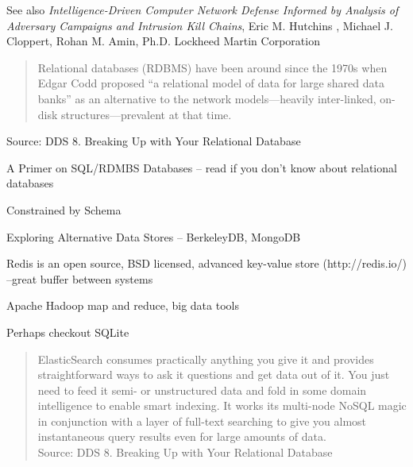 \documentclass[Screen16to9,17pt]{foils}
\begin{document}


\begin{list2}
\item See also \emph{Intelligence-Driven Computer Network Defense Informed by Analysis of Adversary Campaigns and Intrusion Kill Chains}, Eric M. Hutchins , Michael J. Cloppert, Rohan M. Amin, Ph.D. Lockheed Martin Corporation\\{\footnotesize
 }
\end{list2}




\begin{quote}
Relational databases (RDBMS) have been around since the 1970s when Edgar Codd proposed “a relational model of data for large shared data banks” as an alternative to the network models—heavily inter-linked, on-disk structures—prevalent at that time.
\end{quote}
Source: DDS 8. Breaking Up with Your Relational Database

\begin{list2}
\item A Primer on SQL/RDMBS Databases -- read if you don't know about relational databases
\item Constrained by Schema
\item Exploring Alternative Data Stores -- BerkeleyDB, MongoDB
\item Redis is an open source, BSD licensed, advanced key-value store (http://redis.io/) --great buffer between systems
\item Apache Hadoop  map and reduce, big data tools
\item Perhaps checkout SQLite  
\end{list2}




\begin{quote}\small
ElasticSearch consumes practically anything you give it and provides straightforward ways to ask it questions and get data out of it. You just need to feed it semi- or unstructured data and fold in some domain intelligence to enable smart indexing. It works its multi-node NoSQL magic in conjunction with a layer of full-text searching to give you almost instantaneous query results even for large amounts of data.\\
Source: DDS 8. Breaking Up with Your Relational Database
\end{quote}
\end{document}
